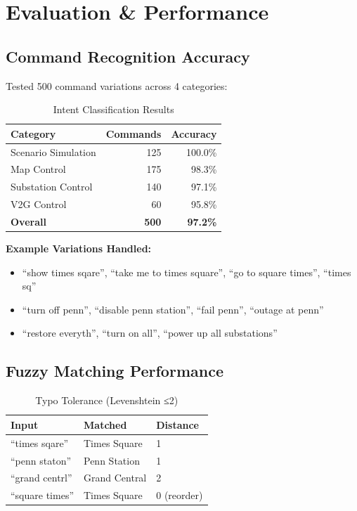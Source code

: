 \documentclass[sigconf]{acmart}
\begin{document}
\section{Evaluation \& Performance}

\subsection{Command Recognition Accuracy}

Tested 500 command variations across 4 categories:

\begin{table}[h]
\centering
\caption{Intent Classification Results}
\begin{tabular}{lrr}
\toprule
\textbf{Category} & \textbf{Commands} & \textbf{Accuracy} \\
\midrule
Scenario Simulation & 125 & 100.0\% \\
Map Control & 175 & 98.3\% \\
Substation Control & 140 & 97.1\% \\
V2G Control & 60 & 95.8\% \\
\midrule
\textbf{Overall} & \textbf{500} & \textbf{97.2\%} \\
\bottomrule
\end{tabular}
\end{table}

\textbf{Example Variations Handled:}
\begin{itemize}
    \item ``show times sqare'', ``take me to times square'', ``go to square times'', ``times sq''
    \item ``turn off penn'', ``disable penn station'', ``fail penn'', ``outage at penn''
    \item ``restore everyth'', ``turn on all'', ``power up all substations''
\end{itemize}

\subsection{Fuzzy Matching Performance}

\begin{table}[h]
\centering
\caption{Typo Tolerance (Levenshtein ≤2)}
\begin{tabular}{lll}
\toprule
\textbf{Input} & \textbf{Matched} & \textbf{Distance} \\
\midrule
``times sqare'' & Times Square & 1 \\
``penn staton'' & Penn Station & 1 \\
``grand centrl'' & Grand Central & 2 \\
``square times'' & Times Square & 0 (reorder) \\
\bottomrule
\end{tabular}
\end{table}
\end{document}
